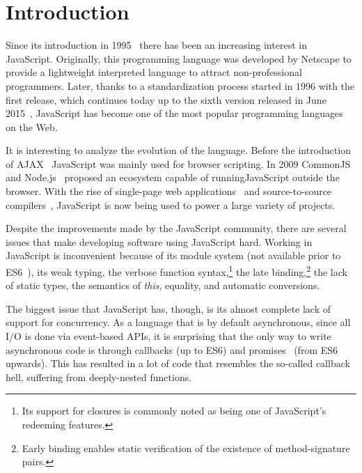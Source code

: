 \documentclass{sig-alternate}
\begin{document}



\section{Introduction}

Since its introduction in 1995~\cite{web:js} there has been an increasing interest in JavaScript. Originally, this programming language was developed by Netscape to provide a lightweight interpreted language to attract non-professional programmers. Later, thanks to a standardization process started in 1996 with the first release, which continues today up to the sixth version released in June 2015~\cite{web:ecmascript6}, JavaScript has become one of the most popular programming languages on the Web.

It is interesting to analyze the evolution of the language. Before the introduction of AJAX~\cite{web:ajax} JavaScript was mainly used for browser scripting. In 2009 CommonJS~\cite{web:commonjs} and Node.js~\cite{web:nodejs} proposed an ecosystem capable of running\newline JavaScript outside the browser. With the rise of single-page web applications~\cite{web:spa} and source-to-source compilers~\cite{web:compile2js}, JavaScript is now being used to power a large variety of projects. 

Despite the improvements made by the JavaScript community, there are several issues that make developing software using JavaScript hard. Working in JavaScript is inconvenient because of its module system (not available prior to ES6~\cite{web:es6modules}), its weak typing, the verbose function syntax,\footnote{Its support for closures is commonly noted as being one of JavaScript\rq{s} redeeming features.} the late binding,\footnote{Early binding enables static verification of the existence of method-signature pairs.} the lack of static types, the semantics of \emph{this}, equality, and automatic conversions.

The biggest issue that JavaScript has, though, is its almost complete lack of support for concurrency. As a language that is by default asynchronous, since all I/O is done via event-based APIs, it is surprising that the only way to write asynchronous code is through callbacks (up to ES6) and promises~\cite{LiskovS88} (from ES6 upwards). This has resulted in a lot of code that resembles the so-called callback hell, suffering from deeply-nested functions.
\end{document}

